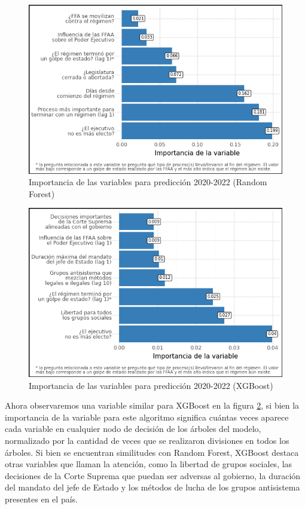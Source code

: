 \documentclass{article}
\begin{document}
\begin{figure}[H]
  \centering  
  \includegraphics[width=1\textwidth]{7_feature_importance_rf.png}
  \caption{Importancia de las variables para predicción 2020-2022 (Random Forest) \label{fig:feat_imp_rf}}
\end{figure}

\begin{figure}[H]
  \centering  
  \includegraphics[width=1\textwidth]{8_feature_importance_xgb.png}
  \caption{Importancia de las variables para predicción 2020-2022 (XGBoost) \label{fig:feat_imp_xgb}}
\end{figure}

Ahora observaremos una variable similar para XGBoost en la figura \ref{fig:feat_imp_xgb}, si bien la 
importancia de la variable para este algoritmo significa cuántas veces aparece cada variable
en cualquier nodo de decisión de los árboles del modelo, normalizado por la cantidad de veces
que se realizaron divisiones en todos los árboles. Si bien se encuentran similitudes con Random Forest,
XGBoost destaca otras variables que llaman la atención, como la libertad de grupos sociales, las 
decisiones de la Corte Suprema que puedan ser adversas al gobierno, la duración del mandato del jefe de 
Estado y los métodos de lucha de los grupos antisistema presentes en el país.
\end{document}
